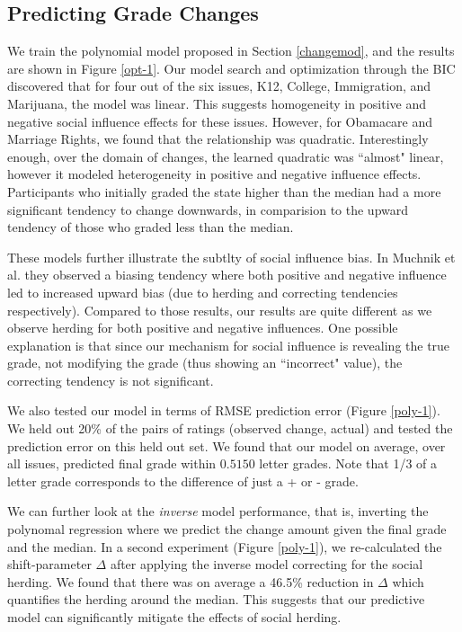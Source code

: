 \subsection{Predicting Grade Changes}
We train the polynomial model proposed in Section \ref{changemod}, and the results are shown in Figure \ref{opt-1}.
Our model search and optimization through the BIC discovered that for four out of the six issues, K12, College, Immigration, and Marijuana, the model was linear.
This suggests homogeneity in positive and negative social influence effects for these issues.
However, for Obamacare and Marriage Rights, we found that the relationship was quadratic.
Interestingly enough, over the domain of changes, the learned quadratic was ``almost" linear, however it modeled heterogeneity in positive and negative influence effects.
Participants who initially graded the state higher than the median had a more significant tendency to change downwards, in comparision to the upward tendency of those who graded less than the median.

These models further illustrate the subtlty of social influence bias. 
In Muchnik et al. they observed a biasing tendency where both positive and negative influence led to increased upward bias (due to herding and correcting tendencies respectively).
Compared to those results, our results are quite different as we observe herding for both positive and negative influences.
One possible explanation is that since our mechanism for social influence is revealing the true grade, not modifying the grade (thus showing an ``incorrect" value), the correcting tendency is not significant.

We also tested our model in terms of RMSE prediction error (Figure \ref{poly-1}). 
We held out 20\% of the pairs of ratings (observed change, actual) and tested the prediction error on this held out set.
We found that our model on average, over all issues, predicted final grade within $0.5150$ letter grades.
Note that 1/3 of a letter grade corresponds to the difference of just a + or - grade.

We can further look at the \emph{inverse} model performance, that is, inverting the polynomal regression where we predict the change amount given the final grade and the median.
In a second experiment (Figure \ref{poly-1}), we re-calculated the shift-parameter $\Delta$ after applying the inverse model correcting for the social herding.
We found that there was on average a 46.5\% reduction in $\Delta$ which quantifies the herding around the median. 
This suggests that our predictive model can significantly mitigate the effects of social herding.

